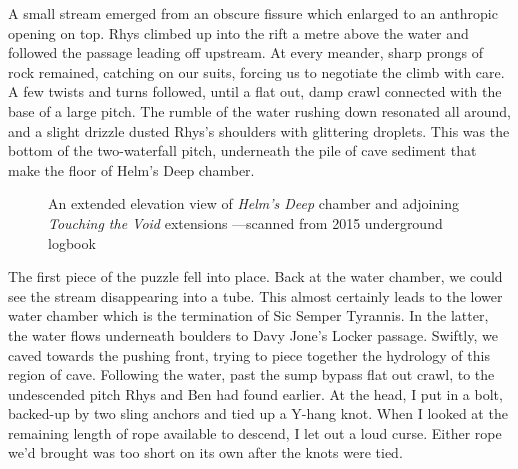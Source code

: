     A small stream emerged from an obscure fissure which enlarged to an anthropic opening on top. Rhys climbed up into the rift a metre above the water and followed the passage leading off upstream. At every meander, sharp prongs of rock remained, catching on our suits, forcing us to negotiate the climb with care. A few twists and turns followed, until a flat out, damp crawl connected with the base of a large pitch. The rumble of the water rushing down resonated all around, and a slight drizzle dusted Rhys's shoulders with glittering droplets. This was the bottom of the two-waterfall pitch, underneath the pile of  cave sediment that make the floor of Helm's Deep chamber. 

    \begin{figure}[t!]
        \checkoddpage \ifoddpage \forcerectofloat \else \forceversofloat \fi
        \centering

        \caption{An extended elevation view of \emph{Helm's Deep} chamber and adjoining \emph{Touching the Void} extensions ---scanned from 2015 underground logbook}
        \label{helms deep}
         
    \end{figure}

    The first piece of the puzzle fell into place. Back at the water chamber, we could see the stream disappearing into a tube. This almost certainly leads to the lower water chamber which is the termination of Sic Semper Tyrannis. In the latter, the water flows underneath boulders to Davy Jone's Locker passage. Swiftly, we caved towards the pushing front, trying to piece together the hydrology of this region of cave. Following the water, past the sump bypass flat out crawl, to the undescended pitch Rhys and Ben had found earlier. At the head, I put in a bolt, backed-up by two sling anchors and tied up a Y-hang knot. When I looked at the remaining length of rope available to descend, I let out a loud curse. Either rope we'd brought was too short on its own after the knots were tied. 

